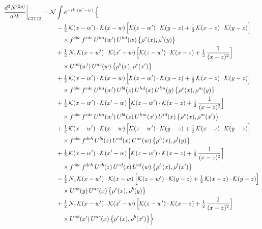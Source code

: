 \documentclass[10pt]{article}
\numberwithin{equation}{section}
\newcommand{\KK}{\mathcal K}
\newcommand{\NN}{\mathcal N}
\begin{document}
\begin{align}
\frac{d^3N^{(2\rho)}}{d^3k}\bigg|_{\rm GII.I2}={}&\NN\int e^{-ik\cdot(w'-w)}\,\Big\{\notag\\
&\quad -\tfrac12\,\KK(x-w')\cdot\KK(x-w)\,\Big[\KK(z-w')\cdot\KK(y-z)+\tfrac12\,\KK(x-z)\cdot\KK(y-z)\Big]\notag\\
&\qquad\times f^{abc}\,f^{cde}\,U^{ha}(w')\,U^{hd}(w)\,\big\{\rho^{e}(x),\rho^{b}(y)\big\}\notag\\
&\quad +\tfrac12\,N_{c}\,\KK(x-w')\cdot\KK(x'-w)\,\Big[\KK(z-w')\cdot\KK(x-z)+\tfrac12\,\frac{1}{(x-z)^2}\Big]\notag\\
&\qquad\times U^{ab}(w')\,U^{ac}(w)\,\big\{\rho^{b}(x),\rho^{c}(x')\big\}\notag\\
&\quad +\tfrac12\,\KK(x-w')\cdot\KK(x-w)\,\Big[\KK(z-w')\cdot\KK(y-z)+\tfrac12\,\KK(x-z)\cdot\KK(y-z)\Big]\notag\\
&\qquad\times f^{abc}\,f^{cde}\,U^{ha}(w')\,U^{bl}(z)\,U^{hd}(x)\,U^{lm}(y)\,\big\{\rho^{e}(x),\rho^{m}(y)\big\}\notag\\
&\quad +\tfrac12\,\KK(x-w')\cdot\KK(x'-w)\,\Big[\KK(z-w')\cdot\KK(x-z)+\tfrac12\,\frac{1}{(x-z)^2}\Big]\notag\\
&\qquad\times f^{abc}\,f^{cde}\,U^{ha}(w')\,U^{bl}(z)\,U^{hm}(x')\,U^{ld}(x)\,\big\{\rho^{e}(x),\rho^{m}(x')\big\}\notag\\
&\quad +\tfrac12\,\KK(x-w')\cdot\KK(x-w)\,\Big[\KK(z-w')\cdot\KK(y-z)+\tfrac12\,\KK(x-z)\cdot\KK(y-z)\Big]\notag\\
&\qquad\times f^{abc}\,f^{deh}\,U^{lb}(z)\,U^{cd}(x)\,U^{ae}(w)\,\big\{\rho^{h}(x),\rho^{l}(y)\big\}\notag\\
&\quad +\tfrac12\,\KK(x-w')\cdot\KK(x'-w)\,\Big[\KK(z-w')\cdot\KK(x-z)+\tfrac12\,\frac{1}{(x-z)^2}\Big]\notag\\
&\qquad\times f^{abc}\,f^{deh}\,U^{eb}(z)\,U^{cd}(x)\,U^{al}(w)\,\big\{\rho^{h}(x),\rho^{l}(x')\big\}\notag\\
&\quad -\tfrac12\,N_{c}\,\KK(x-w')\cdot\KK(x-w)\,\Big[\KK(z-w')\cdot\KK(y-z)+\tfrac12\,\KK(x-z)\cdot\KK(y-z)\Big]\notag\\
&\qquad\times U^{ab}(y)\,U^{ac}(x)\,\big\{\rho^{c}(x),\rho^{b}(y)\big\}\notag\\
&\quad +\tfrac12\,N_{c}\,\KK(x-w')\cdot\KK(x'-w)\,\Big[\KK(z-w')\cdot\KK(x-z)+\tfrac12\,\frac{1}{(x-z)^2}\Big]\notag\\
&\qquad\times U^{ab}(x')\,U^{ac}(x)\,\big\{\rho^{c}(x),\rho^{b}(x')\big\}\Big\}\label{R:eq:sum-GII.I2}
\end{align}
\end{document}
